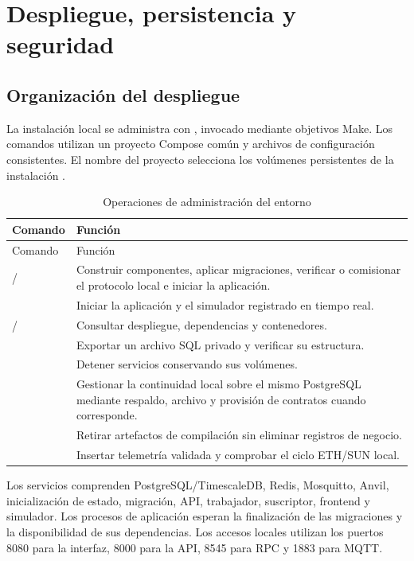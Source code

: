 \section{Despliegue, persistencia y seguridad}
\subsection{Organización del despliegue}
La instalación local se administra con , invocado mediante objetivos Make. Los comandos utilizan un proyecto Compose común y archivos de configuración consistentes. El nombre del proyecto selecciona los volúmenes persistentes de la instalación \citep{deployment,start}.

\begin{longtable}{L{.24\linewidth}L{.66\linewidth}}
\caption{Operaciones de administración del entorno}\label{tab:comandos}\\
\toprule Comando & Función \\ \midrule\endfirsthead
\toprule Comando & Función \\ \midrule\endhead
{} /  & Construir componentes, aplicar migraciones, verificar o comisionar el protocolo local e iniciar la aplicación.\\
 & Iniciar la aplicación y el simulador registrado en tiempo real.\\
 /  & Consultar despliegue, dependencias y contenedores.\\
 & Exportar un archivo SQL privado y verificar su estructura.\\
 & Detener servicios conservando sus volúmenes.\\
 & Gestionar la continuidad local sobre el mismo PostgreSQL mediante respaldo, archivo y provisión de contratos cuando corresponde.\\
 & Retirar artefactos de compilación sin eliminar registros de negocio.\\
 & Insertar telemetría validada y comprobar el ciclo ETH/SUN local.\\
\bottomrule
\end{longtable}
Los servicios comprenden PostgreSQL/TimescaleDB, Redis, Mosquitto, Anvil, inicialización de estado, migración, API, trabajador, suscriptor, frontend y simulador. Los procesos de aplicación esperan la finalización de las migraciones y la disponibilidad de sus dependencias. Los accesos locales utilizan los puertos 8080 para la interfaz, 8000 para la API, 8545 para RPC y 1883 para MQTT.

